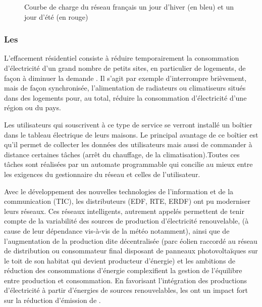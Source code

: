 \bigskip

\begin{figure}[!h]
	\centering
	\caption{Courbe de charge du réseau français un jour d'hiver (en bleu) et un jour d'été (en rouge)}
	\label{courbeCharge}
\end{figure}


\subsubsection{Les \smartgrids{}}

L'effacement résidentiel consiste à réduire temporairement la consommation d'électricité d'un grand nombre de petits sites, en particulier de logements, de façon à diminuer la demande \cite{effResidentiel}. Il s'agit par exemple d'interrompre brièvement, mais de façon synchronisée, l'alimentation de radiateurs ou climatiseurs situés dans des logements pour, au total, réduire la consommation d'électricité d'une région ou du pays.

Les utilisateurs qui souscrivent à ce type de service se verront installé un boîtier dans le tableau électrique de leurs maisons. Le principal avantage de ce boîtier est qu’il permet de collecter les données des utilisateurs mais aussi de commander à distance certaines tâches (arrêt du chauffage, de la climatisation).Toutes ces tâches sont réalisées par un automate programmable qui concilie au mieux entre les exigences du gestionnaire du réseau et celles de l'utilisateur.

Avec le développement des nouvelles technologies de l'information et de la communication (TIC), les distributeurs (EDF, RTE, ERDF) ont pu moderniser leurs réseaux. Ces réseaux intelligents, autrement appelés \smartgrids{} permettent de tenir compte de la variabilité des sources de production d'électricité renouvelable, (à cause de leur dépendance vis-à-vis de la météo notamment), ainsi que de l'augmentation de la production dite décentralisée (parc éolien raccordé au réseau de distribution ou consommateur final disposant de panneaux photovoltaïques sur le toit de son habitat qui devient producteur d'énergie) et les ambitions de réduction des consommations d'énergie complexifient la gestion de l'équilibre entre production et consommation. En favorisant l'intégration des productions d'électricité à partir d'énergies de sources renouvelables, les \smartgrids{} ont un impact fort sur la réduction d'émission de .


